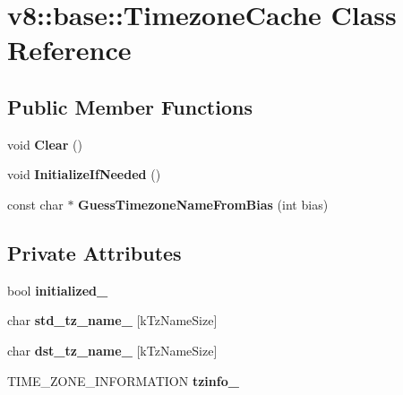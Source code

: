 \hypertarget{classv8_1_1base_1_1_timezone_cache}{}\section{v8\+:\+:base\+:\+:Timezone\+Cache Class Reference}
\label{classv8_1_1base_1_1_timezone_cache}
\subsection*{Public Member Functions}
\begin{DoxyCompactItemize}
\item 
void {\bfseries Clear} ()\hypertarget{classv8_1_1base_1_1_timezone_cache_a50f4cbec36b11fe9dcc75f8a59dd44bf}{}\label{classv8_1_1base_1_1_timezone_cache_a50f4cbec36b11fe9dcc75f8a59dd44bf}

\item 
void {\bfseries Initialize\+If\+Needed} ()\hypertarget{classv8_1_1base_1_1_timezone_cache_a2f5240f2a519739b313e0b2f13067ae9}{}\label{classv8_1_1base_1_1_timezone_cache_a2f5240f2a519739b313e0b2f13067ae9}

\item 
const char $\ast$ {\bfseries Guess\+Timezone\+Name\+From\+Bias} (int bias)\hypertarget{classv8_1_1base_1_1_timezone_cache_aeaf38521a064bad529794a5a5643e9ea}{}\label{classv8_1_1base_1_1_timezone_cache_aeaf38521a064bad529794a5a5643e9ea}

\end{DoxyCompactItemize}
\subsection*{Private Attributes}
\begin{DoxyCompactItemize}
\item 
bool {\bfseries initialized\+\_\+}\hypertarget{classv8_1_1base_1_1_timezone_cache_a29f7b7384215cccc9ecc8717cc8abe4f}{}\label{classv8_1_1base_1_1_timezone_cache_a29f7b7384215cccc9ecc8717cc8abe4f}

\item 
char {\bfseries std\+\_\+tz\+\_\+name\+\_\+} \mbox{[}k\+Tz\+Name\+Size\mbox{]}\hypertarget{classv8_1_1base_1_1_timezone_cache_a177a6efe151d54e4e4dbeb66d34082ac}{}\label{classv8_1_1base_1_1_timezone_cache_a177a6efe151d54e4e4dbeb66d34082ac}

\item 
char {\bfseries dst\+\_\+tz\+\_\+name\+\_\+} \mbox{[}k\+Tz\+Name\+Size\mbox{]}\hypertarget{classv8_1_1base_1_1_timezone_cache_a871fbecc3da6a2f7a444d1289d46e61f}{}\label{classv8_1_1base_1_1_timezone_cache_a871fbecc3da6a2f7a444d1289d46e61f}

\item 
T\+I\+M\+E\+\_\+\+Z\+O\+N\+E\+\_\+\+I\+N\+F\+O\+R\+M\+A\+T\+I\+ON {\bfseries tzinfo\+\_\+}\hypertarget{classv8_1_1base_1_1_timezone_cache_afea5fd41b1d071a5838688bfee91d690}{}\label{classv8_1_1base_1_1_timezone_cache_afea5fd41b1d071a5838688bfee91d690}

\end{DoxyCompactItemize}
